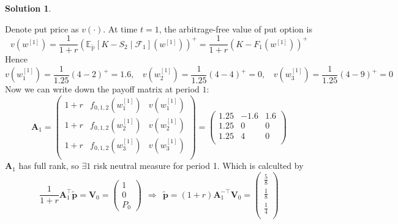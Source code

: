 \documentclass[a4paper, 10pt]{article}
\theoremstyle{definition}
\theoremstyle{hSol}
\newtheorem*{solution}{Solution}
\begin{document}
\begin{solution}
\begin{itemize}
\end{itemize}
Denote put price as $v(\cdot)$. At time $t=1$, the arbitrage-free value of put option is
\begin{equation}
	v(w^{[1]}) = \frac{1}{1+r}\left(\mathbb{E}_{\tilde{\mathbb{P}}}\left[K-S_2\middle|\mathcal{F}_1\right](w^{[1]})\right)^{+} = \frac{1}{1+r}\left(K-F_1(w^{[1]})\right)^+
\end{equation}
Hence
$$
v(w^{[1]}_1) =\frac{1}{1.25}(4-2)^+= 1.6,~~~~v(w^{[1]}_2)=\frac{1}{1.25}(4-4)^+ = 0, ~~~~v(w^{[1]}_3) =\frac{1}{1.25}(4-9)^+= 0
$$
Now we can write down the payoff matrix at period $1$:
\begin{equation}
	\bm{A}_1 = \begin{pmatrix}
	1+r & f_{0,1,2}(w^{[1]}_1) & v(w^{[1]}_1)\\[2pt]
	1+r & f_{0,1,2}(w^{[1]}_2) & v(w^{[1]}_2)\\[2pt]
	1+r & f_{0,1,2}(w^{[1]}_3) & v(w^{[1]}_3)\\[2pt]
\end{pmatrix} = 
\begin{pmatrix}
	1.25 & -1.6 & 1.6\\[2pt]
	1.25 & 0 & 0\\[2pt]
	1.25 & 4 & 0\\[2pt]
\end{pmatrix}
\end{equation}
$\bm{A}_1$ has full rank, so $\exists 1$ risk neutral measure for period 1. Which is calculted by
\begin{equation}
	\frac{1}{1+r}\bm{A}_1^{\top} \tilde{\bm{p}} = \bm{V}_0=\begin{pmatrix}1 \\ 0 \\ P_0\end{pmatrix} ~~\Rightarrow ~~\tilde{\bm{p}} = (1+r) \bm{A}_1^{-\top}\bm{V}_0 = \begin{pmatrix}
		\frac{5}{8} \\[2pt] \frac{1}{8} \\[2pt] \frac{1}{4} \\[2pt]
	\end{pmatrix}
\end{equation}
\end{solution}
\end{document}
